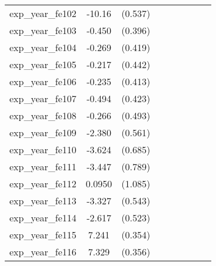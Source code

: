 {\begin{tabular}{l*{4}{cc}}
exp\_year\_fe102&   -10.16\sym{***}&  (0.537)&                  &         &                  &         &                  &         \\
exp\_year\_fe103&   -0.450         &  (0.396)&                  &         &                  &         &                  &         \\
exp\_year\_fe104&   -0.269         &  (0.419)&                  &         &                  &         &                  &         \\
exp\_year\_fe105&   -0.217         &  (0.442)&                  &         &                  &         &                  &         \\
exp\_year\_fe106&   -0.235         &  (0.413)&                  &         &                  &         &                  &         \\
exp\_year\_fe107&   -0.494         &  (0.423)&                  &         &                  &         &                  &         \\
exp\_year\_fe108&   -0.266         &  (0.493)&                  &         &                  &         &                  &         \\
exp\_year\_fe109&   -2.380\sym{***}&  (0.561)&                  &         &                  &         &                  &         \\
exp\_year\_fe110&   -3.624\sym{***}&  (0.685)&                  &         &                  &         &                  &         \\
exp\_year\_fe111&   -3.447\sym{***}&  (0.789)&                  &         &                  &         &                  &         \\
exp\_year\_fe112&   0.0950         &  (1.085)&                  &         &                  &         &                  &         \\
exp\_year\_fe113&   -3.327\sym{***}&  (0.543)&                  &         &                  &         &                  &         \\
exp\_year\_fe114&   -2.617\sym{***}&  (0.523)&                  &         &                  &         &                  &         \\
exp\_year\_fe115&    7.241\sym{***}&  (0.354)&                  &         &                  &         &                  &         \\
exp\_year\_fe116&    7.329\sym{***}&  (0.356)&                  &         &                  &         &                  &         \\

\end{tabular}}
